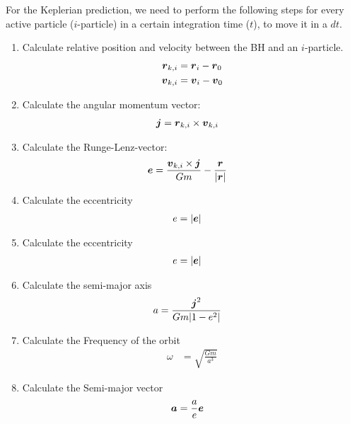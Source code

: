 For the Keplerian prediction, we need to perform the following steps for every
active particle ($i$-particle) in a certain integration time ($t$),
to move it in a $dt$.
\setlength{\columnseprule}{0.4pt}
\begin{multicols}{2}
\begin{enumerate}
    \item Calculate relative position and velocity between the BH and
          an $i$-particle.
          \begin{align}
              \boldsymbol{r}_{k,i} &= \boldsymbol{r}_{i} - \boldsymbol{r}_{0} \\
              \boldsymbol{v}_{k,i} &= \boldsymbol{v}_{i} - \boldsymbol{v}_{0}
          \end{align}

    \item Calculate the angular momentum vector:
        \begin{align}
            \boldsymbol{j} &= \boldsymbol{r}_{k,i} \times \boldsymbol{v}_{k,i}
        \end{align}

    \item Calculate the Runge-Lenz-vector:
        \begin{align}
            \boldsymbol{e} &= \frac{\boldsymbol{v}_{k,i} \times \boldsymbol{j}}{G m} - \frac{\boldsymbol{r}}{|\boldsymbol{r}|}
        \end{align}

    \item Calculate the eccentricity
        \begin{align}
            e  &= |\boldsymbol{e}|
        \end{align}

    \item Calculate the eccentricity
        \begin{align}
            e  &= |\boldsymbol{e}|
        \end{align}

    \item Calculate the semi-major axis
        \begin{align}
            a &= \frac{\boldsymbol{j}^{2}}{G m |1 - e^{2}|}
        \end{align}

    \item Calculate the Frequency of the orbit
        \begin{align}
            \omega &= \sqrt{\frac{Gm}{a^{3}}}
        \end{align}

    \item Calculate the Semi-major vector
        \begin{align}
            \boldsymbol{a} &= \frac{a}{e}\boldsymbol{e}
        \end{align}


\end{enumerate}
\end{multicols}
